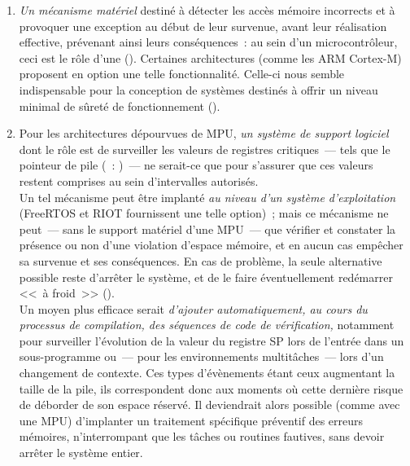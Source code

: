\begin{enumerate}

\item \emph{Un mécanisme matériel} destiné à détecter les accès mémoire
incorrects et à provoquer une exception au début de leur survenue, avant
leur réalisation effective, prévenant ainsi leurs conséquences~: au sein
d'un microcontrôleur, ceci est le rôle d'une  (). Certaines architectures (comme les ARM Cortex-M)
proposent en option une telle fonctionnalité. Celle-ci nous semble
indispensable pour la conception de systèmes destinés à offrir un niveau
minimal de sûreté de fonctionnement ().

\medskip

\item Pour les architectures dépourvues de MPU, \emph{un système de
support logiciel} dont le rôle est de surveiller les valeurs de registres
critiques~--- tels que le pointeur de pile (~: )~--- ne serait-ce que pour s'assurer que ces valeurs restent
comprises au sein d'intervalles autorisés.\\
Un tel mécanisme peut être implanté \emph{au niveau d'un système
d'exploitation} (FreeRTOS et RIOT fournissent une telle option)~;
mais ce mécanisme ne peut~--- sans le support matériel d'une MPU~--- que
vérifier et constater la présence ou non d'une violation d'espace mémoire,
et en aucun cas empêcher sa survenue et ses conséquences. En cas de problème,
la seule alternative possible reste d'arrêter le système, et de le faire
éventuellement redémarrer <<~à froid~>> ().\\
Un moyen plus efficace serait \emph{d'ajouter automatiquement, au cours du
processus de compilation, des séquences de code de vérification,} notamment
pour surveiller l'évolution de la valeur du registre SP lors de l'entrée
dans un sous-programme ou~--- pour les environnements multitâches~---
lors d'un changement de contexte. Ces types d'évènements étant ceux
augmentant la taille de la pile, ils correspondent donc aux moments
où cette dernière risque de déborder de son espace réservé.
Il deviendrait alors possible (comme avec une MPU) d'implanter un
traitement spécifique préventif des erreurs mémoires, n'interrompant que
les tâches ou routines fautives, sans devoir arrêter le système entier.

\end{enumerate}

\bigskip

